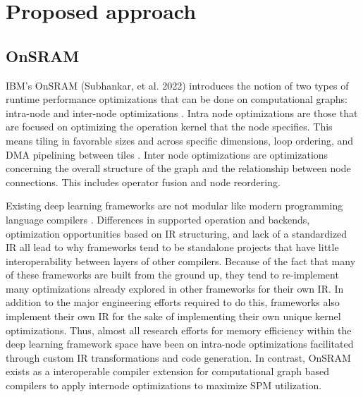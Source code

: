 
\chapter{Proposed approach} %

\label{Chapter3} %


\section{OnSRAM}


IBM's OnSRAM (Subhankar, et al. 2022) introduces the notion of two types of
runtime performance optimizations that can be done on computational graphs:
intra-node and inter-node optimizations \cite{onsram}. Intra node optimizations
are those that are focused on optimizing the operation kernel that the node
specifies. This means tiling in favorable sizes and across specific dimensions,
loop ordering, and DMA pipelining between tiles \cite{aladdin}.
Inter node optimizations are optimizations concerning the overall structure 
of the graph and the relationship between node connections. This includes
operator fusion and node reordering\cite{onsram}. 

Existing deep learning frameworks are not modular like modern programming
language compilers \cite{tensorflow} \cite{TVM} \cite{nGraph}. Differences in
supported operation and backends, optimization opportunities based on IR
structuring, and lack of a standardized IR \cite{nGraph}\cite{DLVM} all lead to
why frameworks tend to be standalone projects that have little interoperability
between layers of other compilers. Because of the fact that many of these
frameworks are built from the ground up, they tend to re-implement many
optimizations already explored in other frameworks for their own IR. In
addition to the major engineering efforts required to do this, frameworks also
implement their own IR for the sake of implementing their own unique kernel
optimizations. Thus, almost all research efforts for memory efficiency within
the deep learning framework space have been on intra-node optimizations
facilitated through custom IR transformations and code generation. In contrast,
OnSRAM exists as a interoperable compiler extension for computational graph
based compilers to apply internode optimizations to maximize SPM utilization.

